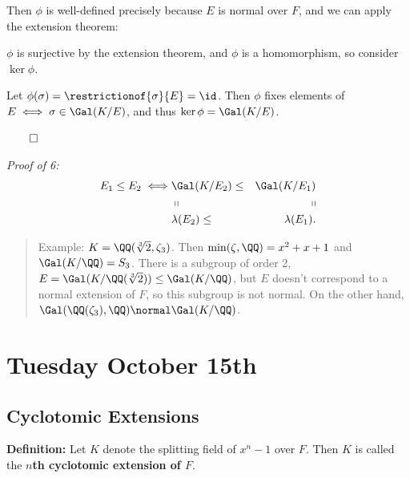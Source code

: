 Then \(\phi\) is well-defined precisely because \(E\) is normal over
\(F\), and we can apply the extension theorem:


\(\phi\) is surjective by the extension theorem, and \(\phi\) is a
homomorphism, so consider \(\ker \phi\).

Let \(\phi(\sigma) = \restrictionof{\sigma}{E} = \id\). Then \(\phi\)
fixes elements of \(E \iff \sigma \in \Gal(K/E)\), and thus
\(\ker \phi = \Gal(K/E)\).

\(\qed\)

\emph{Proof of 6:} \begin{align*}
E_1 \leq E_2 \iff &\Gal(K/E_2) \leq &\Gal(K/E_1) \\
& \shortparallel &\shortparallel \\
&\lambda(E_2) \leq &\lambda(E_1)
.\end{align*}

\begin{quote}
Example: \(K = \QQ(\sqrt[3] 2, \zeta_3)\). Then
\(\min(\zeta, \QQ) = x^2 + x + 1\) and \(\Gal(K/\QQ) = S_3\). There is a
subgroup of order 2, \(E = \Gal(K/\QQ(\sqrt[3] 2)) \leq \Gal(K/\QQ)\),
but \(E\) doesn't correspond to a normal extension of \(F\), so this
subgroup is not normal. On the other hand,
\(\Gal(\QQ(\zeta_3), \QQ) \normal \Gal(K/ \QQ)\).
\end{quote}

\hypertarget{tuesday-october-15th}{%
\section{Tuesday October 15th}\label{tuesday-october-15th}}

\hypertarget{cyclotomic-extensions}{%
\subsection{Cyclotomic Extensions}\label{cyclotomic-extensions}}

\textbf{Definition:} Let \(K\) denote the splitting field of \(x^n-1\)
over \(F\). Then \(K\) is called the \textbf{\(n\)th cyclotomic
extension of \(F\)}.

